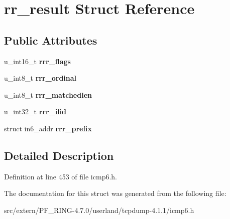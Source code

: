 \hypertarget{structrr__result}{
\section{rr\_\-result Struct Reference}
\label{structrr__result}
}
\subsection*{Public Attributes}
\begin{DoxyCompactItemize}
\item 
\hypertarget{structrr__result_abac4bf6e6fe9be323effb22e3ec43846}{
u\_\-int16\_\-t {\bfseries rrr\_\-flags}}
\label{structrr__result_abac4bf6e6fe9be323effb22e3ec43846}

\item 
\hypertarget{structrr__result_a4cf1fb3ec52f6021873b53fc6dd3b0e5}{
u\_\-int8\_\-t {\bfseries rrr\_\-ordinal}}
\label{structrr__result_a4cf1fb3ec52f6021873b53fc6dd3b0e5}

\item 
\hypertarget{structrr__result_a45233a61a17f047b2322a213e8e2a86d}{
u\_\-int8\_\-t {\bfseries rrr\_\-matchedlen}}
\label{structrr__result_a45233a61a17f047b2322a213e8e2a86d}

\item 
\hypertarget{structrr__result_aecdd0cc104a7d730ebd610bea8ca4492}{
u\_\-int32\_\-t {\bfseries rrr\_\-ifid}}
\label{structrr__result_aecdd0cc104a7d730ebd610bea8ca4492}

\item 
\hypertarget{structrr__result_a95ce88dd26c8c193c3e2bb5ae85327a8}{
struct in6\_\-addr {\bfseries rrr\_\-prefix}}
\label{structrr__result_a95ce88dd26c8c193c3e2bb5ae85327a8}

\end{DoxyCompactItemize}


\subsection{Detailed Description}


Definition at line 453 of file icmp6.h.



The documentation for this struct was generated from the following file:\begin{DoxyCompactItemize}
\item 
src/extern/PF\_\-RING-\/4.7.0/userland/tcpdump-\/4.1.1/icmp6.h\end{DoxyCompactItemize}
